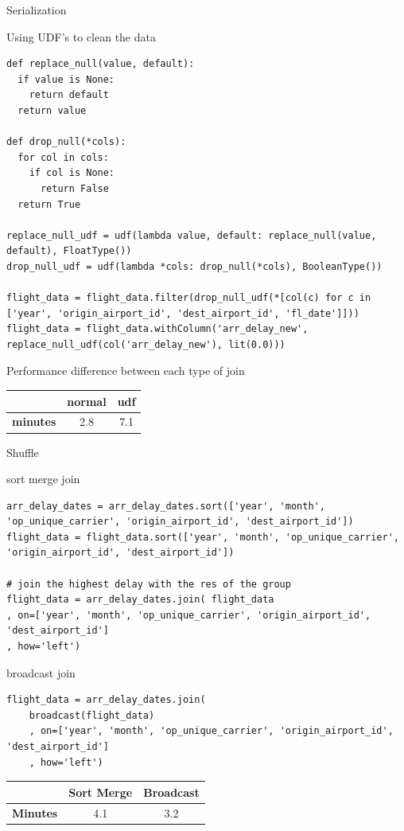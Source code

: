 \documentclass[10pt]{beamer}
\begin{document}
\begin{frame}[fragile]{Serialization}
\begin{multicols}{2}
Using UDF's to clean the data
\begin{lstlisting}
def replace_null(value, default):
  if value is None:
    return default
  return value

def drop_null(*cols):
  for col in cols:
    if col is None:
      return False
  return True

replace_null_udf = udf(lambda value, default: replace_null(value, default), FloatType())
drop_null_udf = udf(lambda *cols: drop_null(*cols), BooleanType())

flight_data = flight_data.filter(drop_null_udf(*[col(c) for c in ['year', 'origin_airport_id', 'dest_airport_id', 'fl_date']]))
flight_data = flight_data.withColumn('arr_delay_new', replace_null_udf(col('arr_delay_new'), lit(0.0)))
\end{lstlisting}
\columnbreak
Performance difference between each type of join
\begin{table}[]
    \centering
    \begin{tabular}{c|c|c}
      & \textbf{normal} & \textbf{udf} \\
      \hline
     \textbf{minutes} & 2.8  & 7.1
    \end{tabular}
    \label{tab:udf}
\end{table}

\end{multicols}
\end{frame}


\begin{frame}[fragile]{Shuffle}
\begin{multicols}{2}
sort merge join
\begin{lstlisting}
arr_delay_dates = arr_delay_dates.sort(['year', 'month', 'op_unique_carrier', 'origin_airport_id', 'dest_airport_id'])
flight_data = flight_data.sort(['year', 'month', 'op_unique_carrier', 'origin_airport_id', 'dest_airport_id'])

# join the highest delay with the res of the group
flight_data = arr_delay_dates.join( flight_data
, on=['year', 'month', 'op_unique_carrier', 'origin_airport_id', 'dest_airport_id']
, how='left')
\end{lstlisting}
\columnbreak
broadcast join
\begin{lstlisting}
flight_data = arr_delay_dates.join( 
    broadcast(flight_data)
    , on=['year', 'month', 'op_unique_carrier', 'origin_airport_id', 'dest_airport_id']
    , how='left')
\end{lstlisting}
\begin{table}[]
    \centering
    \begin{tabular}{c|c|c}
      & \textbf{Sort Merge} & \textbf{Broadcast} \\
      \hline
     \textbf{Minutes} & 4.1  & 3.2
    \end{tabular}
    \label{tab:join}
\end{table}
\end{multicols}
\end{frame}
\end{document}
